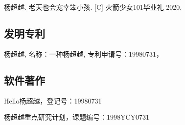 
\begin{publications}{99}
\item 杨超越. 老天也会宠幸笨小孩. [C] 火箭少女101毕业礼 2020.

\subsection*{发明专利}
\setcounter{enumiv}{0}
\item 杨超越, 名称：一种杨超越, 专利申请号：19980731，

\subsection*{软件著作}
\setcounter{enumiv}{0}
\item Hello杨超越，登记号：19980731

\end{publications}

\begin{projects}{99}
  \item 杨超越重点研究计划，课题编号：1998YCY0731
\end{projects}
